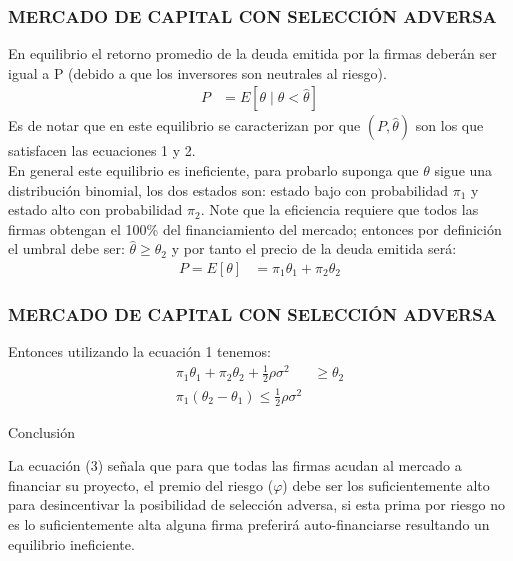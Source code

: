 \begin{frame}
    \frametitle{{\normalsize MERCADO DE CAPITAL CON SELECCIÓN ADVERSA} {}}
    En equilibrio el retorno promedio de la deuda emitida por la firmas deberán ser igual a P (debido a que los inversores son neutrales al riesgo).\\
    \begin{align}
    P&=E[\theta\mid\theta<\hat{\theta}]
    \end{align}
    Es de notar que en este equilibrio se caracterizan por que $(P, \hat{\theta})$ son los que satisfacen las ecuaciones 1 y 2.\\
    En general este equilibrio es ineficiente, para probarlo suponga que $\theta $ sigue una distribución binomial, los dos estados son: estado bajo con probabilidad $\pi_{1}$ y estado alto con probabilidad $\pi_{2}$. Note que la eficiencia requiere que todos las firmas obtengan el 100\% del financiamiento del mercado; entonces por definición el umbral debe ser: $\hat{\theta}\geq \theta_{2} $ y por tanto el precio de la deuda emitida será:
    \begin{align}
    P=E[\theta]&=\pi_{1}\theta_{1}+\pi_{2}\theta_{2} \nonumber
    \end{align}
    
\end{frame}


\begin{frame}
    \frametitle{{\normalsize MERCADO DE CAPITAL CON SELECCIÓN ADVERSA} {}}
     Entonces utilizando la ecuación 1 tenemos:
    \begin{align}
    \pi_{1}\theta_{1}+\pi_{2}\theta_{2}+\frac{1}{2}\rho\sigma^{2}&\geq \theta_{2}\nonumber \\
    \pi_{1}(\theta_{2}-\theta_{1})\leq\frac{1}{2}\rho\sigma^{2}
    \end{align}
    
    \begin{block} {Conclusión}
       
            La ecuación (3) señala que para que todas las firmas acudan al mercado a financiar su proyecto, el premio del riesgo ($\varphi$) debe ser los suficientemente alto para desincentivar la posibilidad de selección adversa, si esta prima por riesgo no es lo suficientemente alta alguna firma preferirá auto-financiarse resultando un equilibrio ineficiente.
         
    \end{block}	

   
\end{frame}


